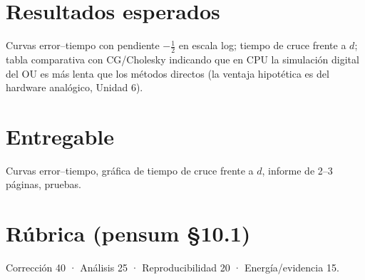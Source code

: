 \documentclass[11pt,a4paper]{article}
\begin{document}
\section*{Resultados esperados}
Curvas error--tiempo con pendiente $-\frac12$ en escala log; tiempo de cruce frente a $d$; tabla comparativa con CG/Cholesky indicando que
en CPU la simulación digital del OU es más lenta que los métodos directos (la ventaja hipotética es del hardware analógico, Unidad 6).
\section*{Entregable}
Curvas error--tiempo, gráfica de tiempo de cruce frente a $d$, informe de 2--3 páginas, pruebas.
\section*{Rúbrica (pensum §10.1)}
Corrección 40 · Análisis 25 · Reproducibilidad 20 · Energía/evidencia 15.
\end{document}

